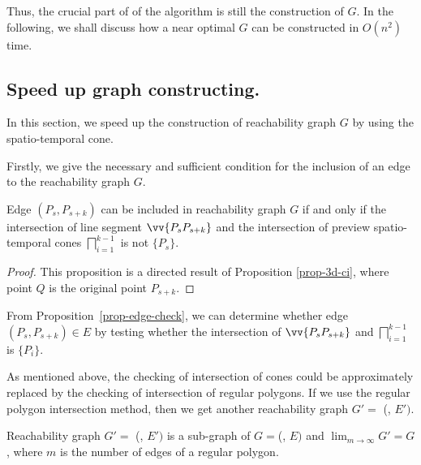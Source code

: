 Thus, the crucial part of of the algorithm is still the construction of $G$. 
In the following, we shall discuss how a near optimal $G$ can be constructed in $O(n^2)$ time.


\subsection{Speed up graph constructing.} %
In this section, we speed up the construction of reachability graph $G$ by using the spatio-temporal cone.

Firstly, we give the necessary and sufficient condition for the inclusion of an edge to the reachability graph $G$.

\begin{prop}
\label{prop-edge-check}
Edge $(P_{s}, P_{s+k})$ can be included in reachability graph $G$ if and only if the intersection of line segment $\vv{P_{s}P_{s+k}}$ and 
the intersection of preview spatio-temporal cones $\bigsqcap_{i=1}^{k-1}$  is not $\{P_s\}$.
\end{prop}

\begin{proof}
This proposition is a directed result of Proposition \ref{prop-3d-ci}, where point $Q$ is the original point $P_{s+k}$. 
\end{proof}


From Proposition~\ref{prop-edge-check}, we can determine whether edge $(P_s, P_{s+k}) \in E$ by testing whether the intersection of $\vv{P_sP_{s+k}}$ and $\bigsqcap_{i=1}^{k - 1}$ is $\{P_i\}$. 


As mentioned above, the checking of intersection of cones could be approximately replaced by the checking of intersection of regular polygons. 
If we use the regular polygon intersection method, then we get another reachability graph $G'=$ (, $E')$.

\begin{prop}
	\label{prop-near-opt-graph}
	Reachability graph $G'=$ (, $E')$ is a sub-graph of $G=$(, $E)$ and $\lim_{m \to \infty}{G'=G}$, where $m$ is the number of edges of a regular polygon.
\end{prop}

